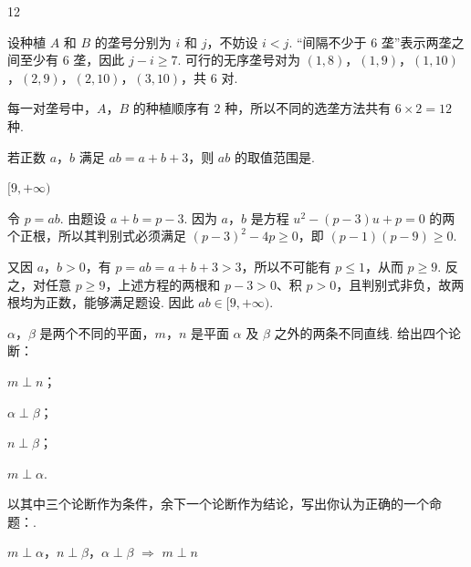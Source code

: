 \begin{answer}
12
\end{answer}

\begin{solution}
设种植 \(A\) 和 \(B\) 的垄号分别为 \(i\) 和 \(j\)，不妨设 \(i<j\). “间隔不少于 \(6\) 垄”表示两垄之间至少有 \(6\) 垄，因此 \(j-i\geqslant7\). 可行的无序垄号对为
\((1,8)\)，\((1,9)\)，\((1,10)\)，\((2,9)\)，\((2,10)\)，\((3,10)\)，共 \(6\) 对.

每一对垄号中，\(A\)，\(B\) 的种植顺序有 \(2\) 种，所以不同的选垄方法共有 \(6\times2=12\) 种.
\end{solution}

\begin{problem}
若正数 \(a\)，\(b\) 满足 \(ab=a+b+3\)，则 \(ab\) 的取值范围是\fillinblank{}.
\end{problem}

\begin{answer}
\([9,+\infty)\)
\end{answer}

\begin{solution}
令 \(p=ab\). 由题设 \(a+b=p-3\). 因为 \(a\)，\(b\) 是方程
\(u^2-(p-3)u+p=0\) 的两个正根，所以其判别式必须满足
\((p-3)^2-4p\geqslant0\)，即 \((p-1)(p-9)\geqslant0\).

又因 \(a\)，\(b>0\)，有 \(p=ab=a+b+3>3\)，所以不可能有 \(p\leqslant1\)，从而 \(p\geqslant9\). 反之，对任意 \(p\geqslant9\)，上述方程的两根和 \(p-3>0\)、积 \(p>0\)，且判别式非负，故两根均为正数，能够满足题设. 因此 \(ab\in[9,+\infty)\).
\end{solution}

\begin{problem}
\(\alpha\)，\(\beta\) 是两个不同的平面，\(m\)，\(n\) 是平面 \(\alpha\) 及 \(\beta\) 之外的两条不同直线. 给出四个论断：

\begin{circlelist}
\item \(m \perp n\)；
\item \(\alpha \perp \beta\)；
\item \(n \perp \beta\)；
\item \(m \perp \alpha\).
\end{circlelist}

以其中三个论断作为条件，余下一个论断作为结论，写出你认为正确的一个命题：\fillinblank{}.
\end{problem}

\begin{answer}
\(m\perp\alpha\)，\(n\perp\beta\)，\(\alpha\perp\beta\) \(\Longrightarrow\) \(m\perp n\)
\end{answer}

